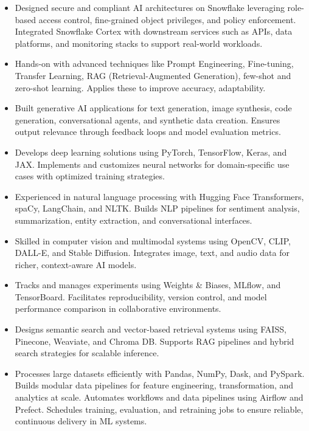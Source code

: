 \documentclass[11pt,letterpaper]{article}
\begin{document}
\begin{itemize}
  \item Designed secure and compliant AI architectures on Snowflake leveraging role-based access
        control, fine-grained object privileges, and policy enforcement. Integrated Snowflake Cortex
        with downstream services such as APIs, data platforms, and monitoring stacks to support
        real-world workloads.

  \item Hands-on with advanced techniques like Prompt Engineering, Fine-tuning, Transfer Learning,
        RAG (Retrieval-Augmented Generation), few-shot and zero-shot learning. Applies these to
        improve accuracy, adaptability.

  \item Built generative AI applications for text generation, image synthesis, code generation,
        conversational agents, and synthetic data creation. Ensures output relevance through feedback
        loops and model evaluation metrics.

  \item Develops deep learning solutions using PyTorch, TensorFlow, Keras, and JAX. Implements and
        customizes neural networks for domain-specific use cases with optimized training strategies.

  \item Experienced in natural language processing with Hugging Face Transformers, spaCy, LangChain,
        and NLTK. Builds NLP pipelines for sentiment analysis, summarization, entity extraction, and
        conversational interfaces.

  \item Skilled in computer vision and multimodal systems using OpenCV, CLIP, DALL-E, and Stable
        Diffusion. Integrates image, text, and audio data for richer, context-aware AI models.

  \item Tracks and manages experiments using Weights \& Biases, MLflow, and TensorBoard. Facilitates
        reproducibility, version control, and model performance comparison in collaborative
        environments.

  \item Designs semantic search and vector-based retrieval systems using FAISS, Pinecone, Weaviate,
        and Chroma DB. Supports RAG pipelines and hybrid search strategies for scalable inference.

  \item Processes large datasets efficiently with Pandas, NumPy, Dask, and PySpark. Builds modular
        data pipelines for feature engineering, transformation, and analytics at scale. Automates
        workflows and data pipelines using Airflow and Prefect. Schedules training, evaluation, and
        retraining jobs to ensure reliable, continuous delivery in ML systems.


\end{itemize}
\end{document}
